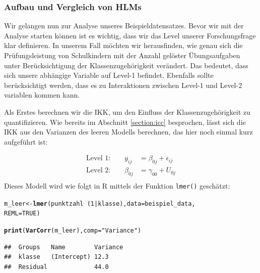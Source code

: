 \documentclass[12pt]{article}\usepackage[]{graphicx}\usepackage[]{color}
\makeatletter
\newcommand{\hlnum}[1]{\textcolor[rgb]{0.686,0.059,0.569}{#1}}%
\newcommand{\hlstr}[1]{\textcolor[rgb]{0.192,0.494,0.8}{#1}}%
\newcommand{\hlopt}[1]{\textcolor[rgb]{0,0,0}{#1}}%
\newcommand{\hlstd}[1]{\textcolor[rgb]{0.345,0.345,0.345}{#1}}%
\newcommand{\hlkwb}[1]{\textcolor[rgb]{0.69,0.353,0.396}{#1}}%
\newcommand{\hlkwc}[1]{\textcolor[rgb]{0.333,0.667,0.333}{#1}}%
\newcommand{\hlkwd}[1]{\textcolor[rgb]{0.737,0.353,0.396}{\textbf{#1}}}%
\newenvironment{kframe}{%
 \def\at@end@of@kframe{}%
 \ifinner\ifhmode%
  \def\at@end@of@kframe{\end{minipage}}%
  \begin{minipage}{\columnwidth}%
 \fi\fi%
 \def\FrameCommand##1{\hskip\@totalleftmargin \hskip-\fboxsep
 \colorbox{shadecolor}{##1}\hskip-\fboxsep
     \hskip-\linewidth \hskip-\@totalleftmargin \hskip\columnwidth}%
 \MakeFramed {\advance\hsize-\width
   \@totalleftmargin\z@ \linewidth\hsize
   \@setminipage}}%
 {\par\unskip\endMakeFramed%
 \at@end@of@kframe}
\newenvironment{knitrout}{}{} %
\makeatother
\begin{document}
\subsubsection{Aufbau und Vergleich von HLMs} \label{section:hlm_r}
\singlespacing

Wir gelangen nun zur Analyse unseres Beispieldatensatzes. Bevor wir mit der Analyse starten können ist es wichtig, dass wir das Level unserer Forschungsfrage klar definieren. In unserem Fall möchten wir herausfinden, wie genau sich die Prüfungsleistung von Schulkindern mit der Anzahl gelöster Übungsaufgaben unter Berücksichtigung der Klassenzugehörigkeit verändert. Das bedeutet, dass sich unsere abhängige Variable auf Level-1 befindet. Ebenfalls sollte berücksichtigt werden, dass es zu Interaktionen zwischen Level-1 und Level-2 variablen kommen kann.

Als Erstes berechnen wir die IKK, um den Einfluss der Klassenzugehörigkeit zu quantifizieren. Wie bereits im Abschnitt \ref{section:icc} besprochen, lässt sich die IKK aus den Varianzen des leeren Modells berechnen, das hier noch einmal kurz aufgeführt ist:

\begin{equation}
\begin{split}	
 \text{Level 1:}  \qquad y_{ij} & = \beta_{0j} + \epsilon_{ij}\\
 \text{Level 2:} \qquad \beta_{0j} & = \gamma_{00} + U_{0j}\\
\end{split}	
\end{equation} 
Dieses Modell wird wie folgt in R mittels der Funktion \texttt{lmer()} geschätzt:

\singlespacing
\begin{knitrout}
\color{fgcolor}\begin{kframe}
\begin{alltt}
\hlstd{m_leer} \hlkwb{<-} \hlkwd{lmer}\hlstd{(punktzahl} \hlopt{~} \hlstd{(}\hlnum{1} \hlopt{|} \hlstd{klasse),} \hlkwc{data} \hlstd{= beispiel_data,}
    \hlkwc{REML} \hlstd{=} \hlnum{TRUE}\hlstd{)}

\hlkwd{print}\hlstd{(}\hlkwd{VarCorr}\hlstd{(m_leer),} \hlkwc{comp} \hlstd{=} \hlstr{"Variance"}\hlstd{)}
\end{alltt}
\begin{verbatim}
##  Groups   Name        Variance
##  klasse   (Intercept) 12.3    
##  Residual             44.0
\end{verbatim}
\end{kframe}
\end{knitrout}
\end{document}
